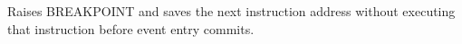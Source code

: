 Raises BREAKPOINT and saves the next instruction address without executing that instruction before event entry commits.
